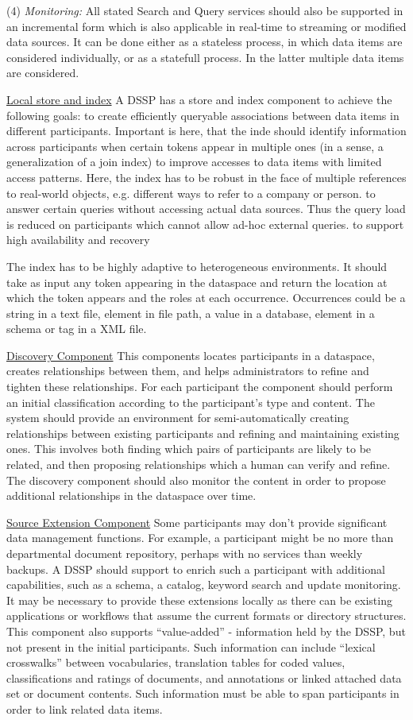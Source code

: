 (4) \emph{Monitoring:} All stated Search and Query services should also be supported in an incremental form which is also applicable in real-time to streaming or modified data sources. It can be done either as a stateless process, in which data items are considered individually, or as a statefull process. In the latter multiple data items are considered.   

\uline{Local store and index} A DSSP has a store and index component to achieve the following goals:
to create efficiently queryable associations between data items in different participants. Important is here, that the inde should identify information across participants when certain tokens appear in multiple ones (in a sense, a generalization of a join index)
to improve accesses to data items with limited access patterns. Here, the index has to be robust in the face of multiple references to real-world objects, e.g. different ways to refer to a company or person.
to answer certain queries without accessing actual data sources. Thus the query load is reduced on participants which cannot allow ad-hoc external queries. 
to support high availability and recovery

The index has to be highly adaptive to heterogeneous environments. It should take as input any token appearing in the dataspace and return the location at which the token appears and the roles at each occurrence. Occurrences could be a string in a text file, element in file path, a value in a database, element in a schema or tag in a XML file. 

\uline{Discovery Component} This components locates participants in a dataspace, creates relationships between them, and helps administrators to refine and tighten these relationships. For each participant the component should perform an initial classification according to the participant's type and content. The system should provide an environment for semi-automatically creating relationships between existing participants and refining and maintaining existing ones. This involves both finding which pairs of participants are likely to be related, and then proposing relationships which a human can verify and refine. The discovery component should also monitor the content in order to propose additional relationships in the dataspace over time.  
 
\uline{Source Extension Component} Some participants may don't provide significant data management functions. For example, a participant might be no more than departmental document repository, perhaps with no services than weekly backups. A DSSP should support to enrich such a participant with additional capabilities, such as a schema, a catalog, keyword search and update monitoring. It may be necessary to provide these extensions locally as there can be existing applications or workflows that assume the current formats or directory structures.	
This component also supports ``value-added'' - information held by the DSSP, but not present in the initial participants. Such information can include ``lexical crosswalks'' between vocabularies, translation tables for coded values, classifications and ratings of documents, and annotations or linked attached data set or document contents. Such information must be able to span participants in order to link related data items.